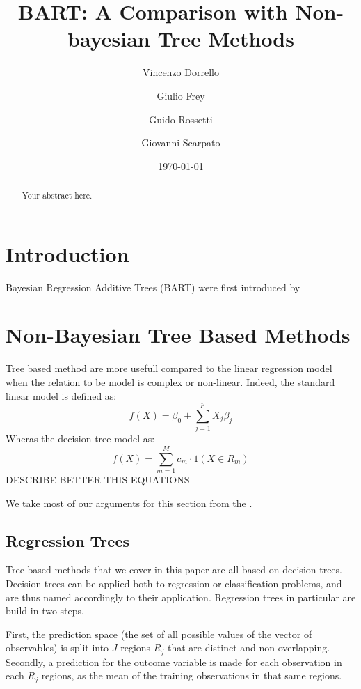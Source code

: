 \documentclass[a4paper,11pt]{article}
\title{BART: A Comparison with Non-bayesian Tree Methods}
\author{
    Vincenzo Dorrello 
    \and
    Giulio Frey 
    \and
    Guido Rossetti 
    \and
    Giovanni Scarpato 
}
\date{\today}
\begin{document}
\maketitle

\begin{abstract}
Your abstract here.
\end{abstract}


\section{Introduction}

Bayesian Regression Additive Trees (BART) were first introduced by \cite{chipmanBARTBayesianAdditive2010}

\section{Non-Bayesian Tree Based Methods}

Tree based method are more usefull compared to the linear regression model when the relation to be model is complex or non-linear. Indeed, the standard linear model is defined as:
\begin{equation}
  f(X) = \beta_0 + \sum_{j=1}^p X_j \beta_j
\end{equation}
Wheras the decision tree model as:
\begin{equation}
  f(X) = \sum_{m=1}^M c_m \cdot 1(X \in R_m)
\end{equation}
DESCRIBE BETTER THIS EQUATIONS

We take most of our arguments for this section from the \cite[Chapter~8]{jamesIntroductionStatisticalLearning2021}.

\subsection{Regression Trees}

Tree based methods that we cover in this paper are all based on decision trees. Decision trees can be applied both to regression or classification problems, and are thus named accordingly to their application. Regression trees in particular are build in two steps.

First, the prediction space (the set of all possible values of the vector of observables) is split into $J$ regions $R_j$ that are distinct and non-overlapping.  Secondly, a prediction for the outcome variable is made for each observation in each $R_j$ regions, as the mean of the training observations in that same regions.
\end{document}
